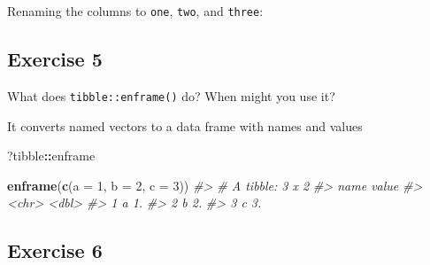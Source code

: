 \documentclass[]{book}
\newenvironment{Shaded}{\begin{snugshade}}{\end{snugshade}}
\newcommand{\CommentTok}[1]{\textcolor[rgb]{0.56,0.35,0.01}{\textit{#1}}}
\newcommand{\DataTypeTok}[1]{\textcolor[rgb]{0.13,0.29,0.53}{#1}}
\newcommand{\DecValTok}[1]{\textcolor[rgb]{0.00,0.00,0.81}{#1}}
\newcommand{\KeywordTok}[1]{\textcolor[rgb]{0.13,0.29,0.53}{\textbf{#1}}}
\newcommand{\NormalTok}[1]{#1}
\newcommand{\OperatorTok}[1]{\textcolor[rgb]{0.81,0.36,0.00}{\textbf{#1}}}
\newcommand{\StringTok}[1]{\textcolor[rgb]{0.31,0.60,0.02}{#1}}
\theoremstyle{definition}
\theoremstyle{definition}
\theoremstyle{definition}
\theoremstyle{remark}
\begin{document}
Renaming the columns to \texttt{one}, \texttt{two}, and \texttt{three}:

\begin{Shaded}
\end{Shaded}

\hypertarget{exercise-5-5}{%
\subsection{Exercise 5}\label{exercise-5-5}}

What does \texttt{tibble::enframe()} do? When might you use it?

It converts named vectors to a data frame with names and values

\begin{Shaded}
\begin{Highlighting}[]
\NormalTok{?tibble}\OperatorTok{::}\NormalTok{enframe}
\end{Highlighting}
\end{Shaded}

\begin{Shaded}
\begin{Highlighting}[]
\KeywordTok{enframe}\NormalTok{(}\KeywordTok{c}\NormalTok{(}\DataTypeTok{a =} \DecValTok{1}\NormalTok{, }\DataTypeTok{b =} \DecValTok{2}\NormalTok{, }\DataTypeTok{c =} \DecValTok{3}\NormalTok{))}
\CommentTok{#> # A tibble: 3 x 2}
\CommentTok{#>   name  value}
\CommentTok{#>   <chr> <dbl>}
\CommentTok{#> 1 a        1.}
\CommentTok{#> 2 b        2.}
\CommentTok{#> 3 c        3.}
\end{Highlighting}
\end{Shaded}

\hypertarget{exercise-6-4}{%
\subsection{Exercise 6}\label{exercise-6-4}}
\end{document}
